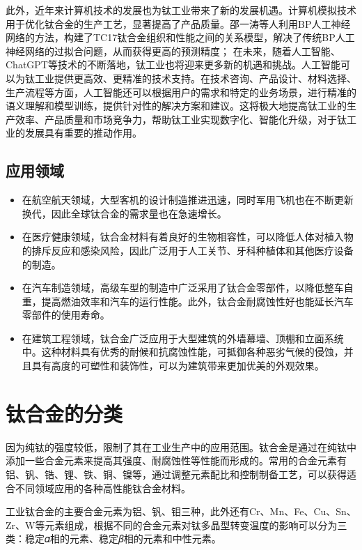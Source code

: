 此外，近年来计算机技术的发展也为钛工业带来了新的发展机遇。计算机模拟技术用于优化钛合金的生产工艺，显著提高了产品质量。邵一涛等人利用BP人工神经网络的方法，构建了TC17钛合金组织和性能之间的关系模型，解决了传统BP人工神经网络的过拟合问题，从而获得更高的预测精度\cite{BP}；%
在未来，随着人工智能、ChatGPT等技术的不断落地，钛工业也将迎来更多新的机遇和挑战\cite{Moni}。人工智能可以为钛工业提供更高效、更精准的技术支持。在技术咨询、产品设计、材料选择、生产流程等方面，人工智能还可以根据用户的需求和特定的业务场景，进行精准的语义理解和模型训练，提供针对性的解决方案和建议。这将极大地提高钛工业的生产效率、产品质量和市场竞争力，帮助钛工业实现数字化、智能化升级，对于钛工业的发展具有重要的推动作用。
\subsection{应用领域}

\begin{itemize}
\item  在航空航天领域，大型客机的设计制造推进迅速，同时军用飞机也在不断更新换代，因此全球钛合金的需求量也在急速增长。
\item  在医疗健康领域，钛合金材料有着良好的生物相容性，可以降低人体对植入物的排斥反应和感染风险，因此广泛用于人工关节、牙科种植体和其他医疗设备的制造。
\item  在汽车制造领域，高级车型的制造中广泛采用了钛合金零部件，以降低整车自重，提高燃油效率和汽车的运行性能。此外，钛合金耐腐蚀性好也能延长汽车零部件的使用寿命。
\item  在建筑工程领域，钛合金广泛应用于大型建筑的外墙幕墙、顶棚和立面系统中。这种材料具有优秀的耐候和抗腐蚀性能，可抵御各种恶劣气候的侵蚀，并且具有高度的可塑性和装饰性，可以为建筑带来更加优美的外观效果。

\end{itemize}
\section{钛合金的分类}
\label{sec:1.1}
因为纯钛的强度较低，限制了其在工业生产中的应用范围。钛合金是通过在纯钛中添加一些合金元素来提高其强度、耐腐蚀性等性能而形成的。常用的合金元素有铝、钒、锆、锂、铁、铜、镍等，通过调整元素配比和控制制备工艺，可以获得适合不同领域应用的各种高性能钛合金材料。

工业钛合金的主要合金元素为铝、钒、钼三种，此外还有Cr、Mn、Fe、Cu、Sn、Zr、W等元素组成，根据不同的合金元素对钛多晶型转变温度的影响可以分为三类：稳定𝛼相的元素、稳定𝛽相的元素和中性元素。

